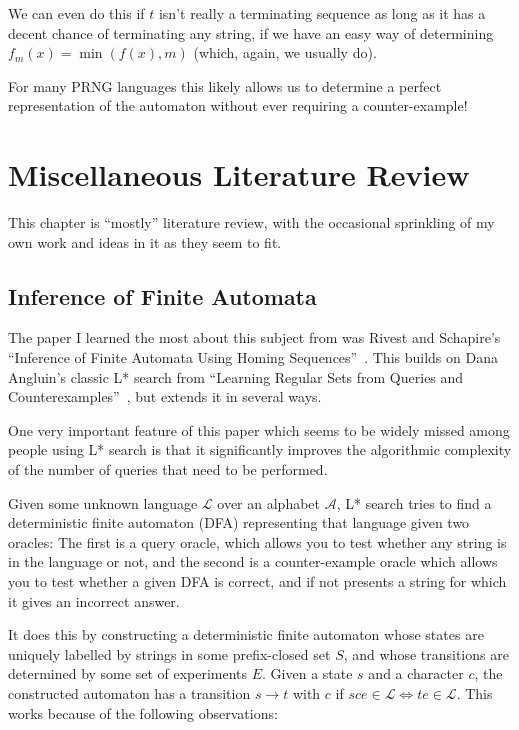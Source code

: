 \documentclass[a4paper]{book}
\begin{document}
We can even do this if \(t\) isn't really a terminating sequence as long as it has a decent chance of terminating any string,
if we have an easy way of determining \(f_m(x) = \min(f(x), m)\) (which, again, we usually do).

For many PRNG languages this likely allows us to determine a perfect representation of the automaton without ever requiring a counter-example!

\chapter{Miscellaneous Literature Review}

This chapter is ``mostly'' literature review,
with the occasional sprinkling of my own work and ideas in it as they seem to fit.


\section{Inference of Finite Automata}\label{sec:langinference}

The paper I learned the most about this subject from was Rivest and Schapire's ``Inference of Finite Automata Using Homing Sequences''~\cite{DBLP:journals/iandc/RivestS93}.
This builds on Dana Angluin's classic L* search from ``Learning Regular Sets from Queries and Counterexamples''~\cite{DBLP:journals/iandc/Angluin87},
but extends it in several ways.

One very important feature of this paper which seems to be widely missed among people using L* search is that it significantly improves the algorithmic complexity of the number of queries that need to be performed.

Given some unknown language \(\mathcal{L}\) over an alphabet \(\mathcal{A}\),
L* search tries to find a deterministic finite automaton (DFA) representing that language given two oracles:
The first is a query oracle,
which allows you to test whether any string is in the language or not,
and the second is a counter-example oracle which allows you to test whether a given DFA is correct,
and if not presents a string for which it gives an incorrect answer.

It does this by constructing a deterministic finite automaton whose states are uniquely labelled by strings in some prefix-closed set \(S\),
and whose transitions are determined by some set of experiments \(E\).
Given a state \(s\) and a character \(c\),
the constructed automaton has a transition \(s \to t\) with \(c\) if \(sce \in \mathcal{L} \iff te \in \mathcal{L}\).
This works because of the following observations:
\end{document}
